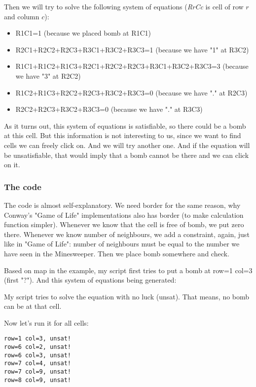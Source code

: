 Then we will try to solve the following system of equations (\emph{RrCc} is cell of row $r$ and column $c$):

\begin{itemize}
\item R1C1=1                                         (because we placed bomb at R1C1)	
\item R2C1+R2C2+R2C3+R3C1+R3C2+R3C3=1                (because we have "1" at R3C2)	
\item R1C1+R1C2+R1C3+R2C1+R2C2+R2C3+R3C1+R3C2+R3C3=3 (because we have "3" at R2C2)	
\item R1C2+R1C3+R2C2+R2C3+R3C2+R3C3=0                (because we have "." at R2C3)	
\item R2C2+R2C3+R3C2+R3C3=0                          (because we have "." at R3C3)
\end{itemize}

As it turns out, this system of equations is satisfiable, so there could be a bomb at this cell.
But this information is not interesting to us, since we want to find cells we can freely click on.
And we will try another one.
And if the equation will be unsatisfiable, that would imply that a bomb cannot be there and we can click on it.

\subsubsection{The code}



The code is almost self-explanatory.
We need border for the same reason, why Conway's "Game of Life" implementations also has border (to make calculation
function simpler).
Whenever we know that the cell is free of bomb, we put zero there.
Whenever we know number of neighbours, we add a constraint, again, just like in "Game of Life": number of neighbours must be equal to the number we have seen in the Minesweeper.
Then we place bomb somewhere and check.

Based on map in the example, my script first tries to put a bomb at row=1 col=3 (first "?").
And this system of equations being generated:



My script tries to solve the equation with no luck (unsat). That means, no bomb can be at that cell.

Now let's run it for all cells:

\begin{lstlisting}
row=1 col=3, unsat!
row=6 col=2, unsat!
row=6 col=3, unsat!
row=7 col=4, unsat!
row=7 col=9, unsat!
row=8 col=9, unsat!
\end{lstlisting}

